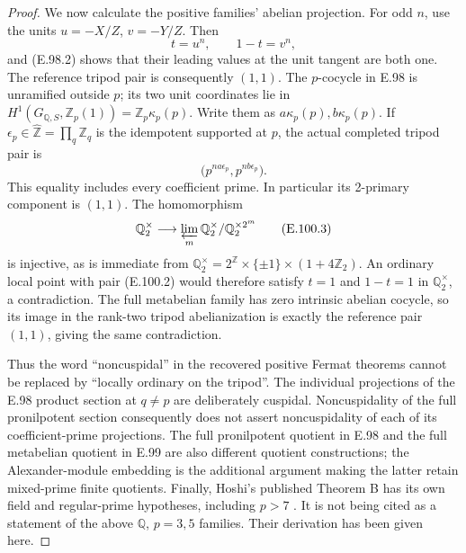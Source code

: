 \begin{proof}
We now calculate the positive families' abelian projection.  For
odd \(n\), use the units \(u=-X/Z\), \(v=-Y/Z\).  Then
\[
 t=u^n,\qquad 1-t=v^n,
\]
and (E.98.2) shows that their leading values at the unit tangent
are both one.  The reference tripod pair is consequently \((1,1)\).
The \(p\)-cocycle in E.98 is unramified outside \(p\); its two unit
coordinates lie in
\(H^1(G_{\mathbb Q,S},\mathbb Z_p(1))=\mathbb Z_p\kappa_p(p)\).
Write them as \(a\kappa_p(p),b\kappa_p(p)\).  If
\(\epsilon_p\in\widehat{\mathbb Z}=\prod_q\mathbb Z_q\) is the
idempotent supported at \(p\), the actual completed tripod pair is
\[
             \bigl(p^{na\epsilon_p},p^{nb\epsilon_p}\bigr).
                                                               \tag{E.100.2}
\]
This equality includes every coefficient prime.  In particular its
2-primary component is \((1,1)\).  The homomorphism
\[
 \mathbb Q_2^\times\longrightarrow
       \varprojlim_m\mathbb Q_2^\times/\mathbb Q_2^{\times 2^m}
                                                               \tag{E.100.3}
\]
is injective, as is immediate from
\(\mathbb Q_2^\times=2^{\mathbb Z}\times\{\pm1\}\times
(1+4\mathbb Z_2)\).
An ordinary local point with pair (E.100.2) would therefore satisfy
\(t=1\) and \(1-t=1\) in \(\mathbb Q_2^\times\), a contradiction.
The full metabelian family has zero intrinsic abelian cocycle, so its
image in the rank-two tripod abelianization is exactly the reference
pair \((1,1)\), giving the same contradiction.

Thus the word ``noncuspidal'' in the recovered positive Fermat
theorems cannot be replaced by ``locally ordinary on the tripod''.
The individual projections of the E.98 product section at
\(q\ne p\) are deliberately cuspidal.  Noncuspidality of the full
pronilpotent section consequently does not assert noncuspidality of
each of its coefficient-prime projections.
The full pronilpotent quotient in E.98 and the full metabelian
quotient in E.99 are also different quotient constructions; the
Alexander-module embedding is the additional argument making the
latter retain mixed-prime finite quotients.  Finally, Hoshi's
published Theorem B has its own field and regular-prime hypotheses,
including \(p>7\) \citep[author p.~5]{LitHoshi2010}.  It is not
being cited as a statement of the above \(\mathbb Q\), \(p=3,5\)
families.  Their derivation has been given here.
\end{proof}

